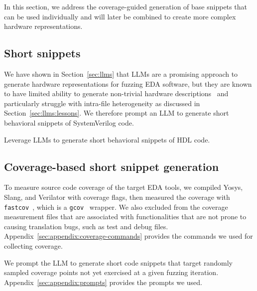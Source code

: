 In this section, we address the coverage-guided generation of base snippets that can be used individually and will later be combined to create more complex hardware representations.


\subsection{Short snippets}
\label{sec:codegen:short-snippet-generation}

We have shown in Section~\ref{sec:llms} that LLMs are a promising approach to generate hardware representations for fuzzing EDA software,
but they are known to have limited ability to generate non-trivial hardware descriptions~\cite{hdl2v,10.1145/3643681} and particularly struggle with intra-file heterogeneity as discussed in Section~\ref{sec:llms:lessons}.
We therefore prompt an LLM to generate short behavioral snippets of SystemVerilog code.

\begin{newdesignprinciple}
    Leverage LLMs to generate short behavioral snippets of HDL code.
\end{newdesignprinciple}


\subsection{Coverage-based short snippet generation}
\label{sec:codegen:Coverage-snippet-generation}

To measure source code coverage of the target EDA tools, we compiled Yosys, Slang, and Verilator with coverage flags, then measured the coverage with \texttt{fastcov}~\cite{Gillespie_fastcov_2024}, which is a \texttt{gcov}~\cite{GCC_gcov_14_1_0} wrapper.
%
We also excluded from the coverage measurement files that are associated with functionalities that are not prone to causing translation bugs, such as test and debug files.
Appendix~\ref{sec:appendix:coverage-commands} provides the commands we used for collecting coverage.

We prompt the LLM to generate short code snippets that target randomly sampled coverage points not yet exercised at a given fuzzing iteration.
Appendix~\ref{sec:appendix:prompts} provides the prompts we used.

